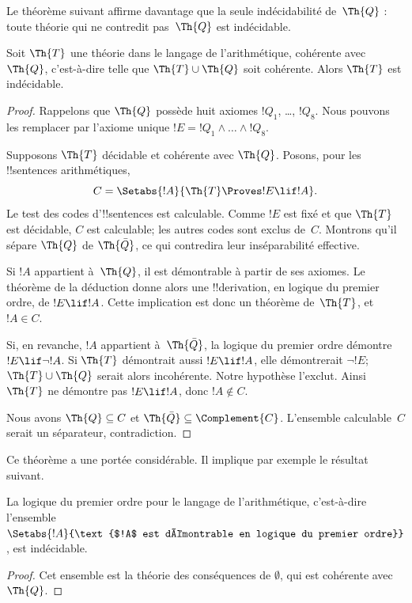 \documentclass[../../../include/open-logic-section]{subfiles}
\begin{document}


Le théorème suivant affirme davantage que la seule
indécidabilité de~$\Th{Q}$ : toute théorie qui ne
contredit pas~$\Th{Q}$ est indécidable.

\begin{thm}
Soit $\Th{T}$ une théorie dans le langage de
l'arithmétique, cohérente avec~$\Th{Q}$,
c'est-à-dire telle que $\Th{T}\cup\Th{Q}$ soit
cohérente. Alors $\Th{T}$ est indécidable.
\end{thm}

\begin{proof}
Rappelons que $\Th{Q}$ possède huit axiomes
$!Q_1$, \dots, $!Q_8$. Nous pouvons les remplacer
par l'axiome unique $!E=!Q_1\land\dots\land !Q_8$.

Supposons $\Th{T}$ décidable et cohérente avec
$\Th{Q}$. Posons, pour les !!{sentence}s arithmétiques,
\[
C=\Setabs{!A}{\Th{T}\Proves !E\lif !A}.
\]
Le test des codes d'!!{sentence}s est calculable. Comme $!E$ est fixé
et que $\Th{T}$ est décidable, $C$ est calculable; les autres codes sont exclus de~$C$.
Montrons qu'il sépare $\Th{Q}$ de $\Th{\bar Q}$,
ce qui contredira leur inséparabilité effective.

Si $!A$ appartient à~$\Th{Q}$, il est démontrable
à partir de ses axiomes. Le théorème de la déduction
donne alors une !!{derivation}, en logique du premier
ordre, de $!E\lif !A$. Cette implication est donc
un théorème de~$\Th{T}$, et $!A\in C$.

Si, en revanche, $!A$ appartient à~$\Th{\bar Q}$,
la logique du premier ordre démontre
$!E\lif\lnot !A$. Si $\Th{T}$ démontrait aussi
$!E\lif !A$, elle démontrerait $\lnot !E$;
$\Th{T}\cup\Th{Q}$ serait alors incohérente.
Notre hypothèse l'exclut. Ainsi $\Th{T}$ ne
démontre pas $!E\lif !A$, donc $!A\notin C$.

Nous avons $\Th{Q}\subseteq C$ et
$\Th{\bar Q}\subseteq\Complement{C}$.
L'ensemble calculable~$C$ serait un séparateur,
contradiction.
\end{proof}

Ce théorème a une portée considérable. Il implique
par exemple le résultat suivant.

\begin{cor}
La logique du premier ordre pour le langage de
l'arithmétique, c'est-à-dire l'ensemble
$\Setabs{!A}{\text{$!A$ est démontrable en logique du premier ordre}}$,
est indécidable.
\end{cor}

\begin{proof}
Cet ensemble est la théorie des conséquences de
$\emptyset$, qui est cohérente avec~$\Th{Q}$.
\end{proof}
\end{document}
